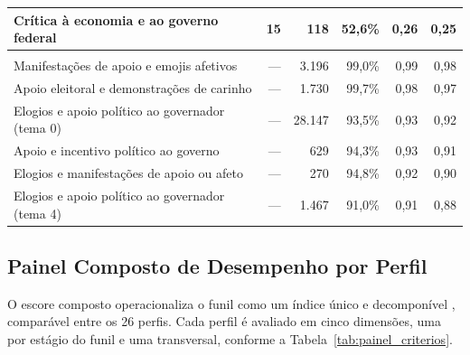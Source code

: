 \begin{table}[htb]
\begin{tabular}{>{\raggedright\arraybackslash}p{7.4cm}rrrrr}
Crítica à economia e ao governo federal & 15 & 118 & 52,6\% & 0,26 & 0,25 \\
\midrule
\multicolumn{6}{l}{\emph{Temas de comentário de maior escore}} \\
Manifestações de apoio e emojis afetivos & --- & 3.196 & 99,0\% & 0,99 & 0,98 \\
Apoio eleitoral e demonstrações de carinho & --- & 1.730 & 99,7\% & 0,98 & 0,97 \\
Elogios e apoio político ao governador (tema 0) & --- & 28.147 & 93,5\% & 0,93 & 0,92 \\
Apoio e incentivo político ao governo & --- & 629 & 94,3\% & 0,93 & 0,91 \\
Elogios e manifestações de apoio ou afeto & --- & 270 & 94,8\% & 0,92 & 0,90 \\
Elogios e apoio político ao governador (tema 4) & --- & 1.467 & 91,0\% & 0,91 & 0,88 \\
\bottomrule
\end{tabular}
\end{table}


\subsection{Painel Composto de Desempenho por Perfil}\label{sec:scorecard}

O escore composto operacionaliza o funil como um índice único e decomponível \cite{nardo2008}, comparável entre os 26 perfis. Cada perfil é avaliado em cinco dimensões, uma por estágio do funil e uma transversal, conforme a Tabela~\ref{tab:painel_criterios}.

